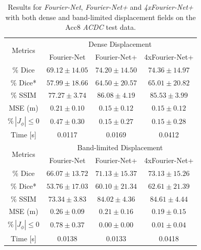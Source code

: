 \documentclass[english,version-2022-01]{uzl-thesis} %
\begin{document}
\begin{table}[h] %
	\centering
	\caption{Results for \emph{Fourier-Net}, \emph{Fourier-Net+} and \emph{4xFourier-Net+} with both dense and band-limited displacement fields on the Acc8 \emph{ACDC} test data.}
	\label{tab:DenseDisplacementAcc8}
	\begin{tabular}{c c c c} %
		\toprule
		\multirow{2}{*}{Metrics} & \multicolumn{3}{c}{Dense Displacement} \\
		\cline{2-4} 
		 & Fourier-Net & Fourier-Net+ & 4xFourier-Net+\\	
		\midrule
		$\%$ Dice & $69.12 \pm 14.05$ & $74.20 \pm 14.50$ & $74.36 \pm 14.97$\\
		$\%$ Dice* & $57.99 \pm 18.66$ & $64.50 \pm 20.57$ & $65.01 \pm 20.82$ \\
		$\%$ SSIM & $77.27 \pm 3.74$ & $86.08 \pm 4.19$ & $85.53 \pm 3.99$\\
		MSE (m) & $0.21 \pm 0.10$ & $0.15 \pm 0.12$ & $0.15 \pm 0.12$ \\
		$\% \, |J_{\phi}|\leq0$ & $0.47 \pm 0.30$ & $0.15 \pm 0.27$ & $0.15 \pm 0.28$ \\
		Time [s] 	  & 0.0117 & 0.0169 & 0.0412  \\
		\midrule
		\multirow{2}{*}{Metrics} & \multicolumn{3}{c}{Band-limited Displacement} \\
		\cline{2-4} 
		 & Fourier-Net & Fourier-Net+ & 4xFourier-Net+\\		
		\midrule
		$\%$ Dice & $66.07 \pm 13.72$ & $71.13 \pm 15.37$ & $73.13 \pm 15.26$\\
		$\%$ Dice* & $53.76 \pm 17.03$ & $60.10 \pm 21.34$ & $62.61 \pm 21.39$ \\
		$\%$ SSIM & $73.34 \pm 3.83$ & $84.02 \pm 4.36$ & $84.61 \pm 4.44$\\
		MSE (m) & $0.26 \pm 0.09$ & $0.21 \pm 0.16$ & $0.19 \pm 0.15$ \\
		$\% \, |J_{\phi}|\leq0$ & $0.78 \pm 0.37$ & $0.00 \pm 0.00$ & $0.01 \pm 0.04$ \\
		Time [s] 	  & 0.0138 & 0.0133 & 0.0418  \\
		\bottomrule
	\end{tabular}	
\end{table}
\end{document}
